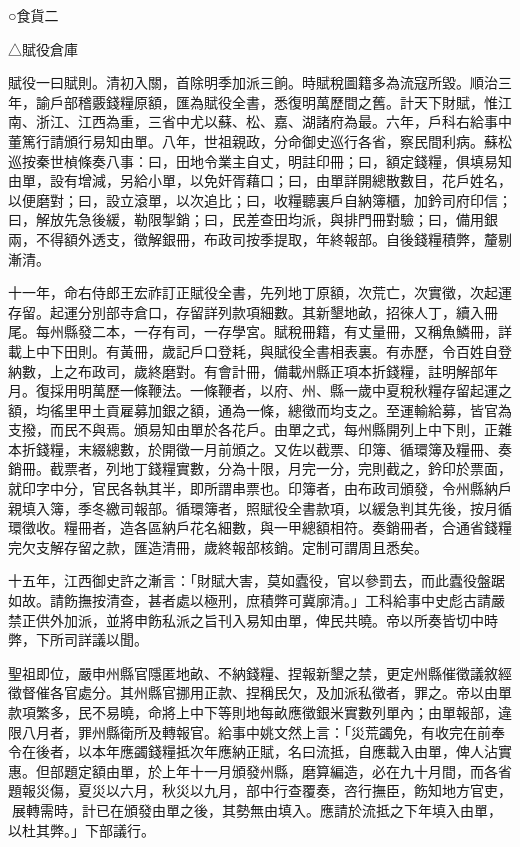 
\begin{pinyinscope}
○食貨二

△賦役倉庫

賦役一曰賦則。清初入關，首除明季加派三餉。時賦稅圖籍多為流寇所毀。順治三年，諭戶部稽覈錢糧原額，匯為賦役全書，悉復明萬歷間之舊。計天下財賦，惟江南、浙江、江西為重，三省中尤以蘇、松、嘉、湖諸府為最。六年，戶科右給事中董篤行請頒行易知由單。八年，世祖親政，分命御史巡行各省，察民間利病。蘇松巡按秦世楨條奏八事：曰，田地令業主自丈，明註印冊；曰，額定錢糧，俱填易知由單，設有增減，另給小單，以免奸胥藉口；曰，由單詳開總散數目，花戶姓名，以便磨對；曰，設立滾單，以次追比；曰，收糧聽裏戶自納簿櫃，加鈐司府印信；曰，解放先急後緩，勒限掣銷；曰，民差查田均派，與排門冊對驗；曰，備用銀兩，不得額外透支，徵解銀冊，布政司按季提取，年終報部。自後錢糧積弊，釐剔漸清。

十一年，命右侍郎王宏祚訂正賦役全書，先列地丁原額，次荒亡，次實徵，次起運存留。起運分別部寺倉口，存留詳列款項細數。其新墾地畝，招徠人丁，續入冊尾。每州縣發二本，一存有司，一存學宮。賦稅冊籍，有丈量冊，又稱魚鱗冊，詳載上中下田則。有黃冊，歲記戶口登耗，與賦役全書相表裏。有赤歷，令百姓自登納數，上之布政司，歲終磨對。有會計冊，備載州縣正項本折錢糧，註明解部年月。復採用明萬歷一條鞭法。一條鞭者，以府、州、縣一歲中夏稅秋糧存留起運之額，均徭里甲土貢雇募加銀之額，通為一條，總徵而均支之。至運輸給募，皆官為支撥，而民不與焉。頒易知由單於各花戶。由單之式，每州縣開列上中下則，正雜本折錢糧，末綴總數，於開徵一月前頒之。又佐以截票、印簿、循環簿及糧冊、奏銷冊。截票者，列地丁錢糧實數，分為十限，月完一分，完則截之，鈐印於票面，就印字中分，官民各執其半，即所謂串票也。印簿者，由布政司頒發，令州縣納戶親填入簿，季冬繳司報部。循環簿者，照賦役全書款項，以緩急判其先後，按月循環徵收。糧冊者，造各區納戶花名細數，與一甲總額相符。奏銷冊者，合通省錢糧完欠支解存留之款，匯造清冊，歲終報部核銷。定制可謂周且悉矣。

十五年，江西御史許之漸言：「財賦大害，莫如蠹役，官以參罰去，而此蠹役盤踞如故。請飭撫按清查，甚者處以極刑，庶積弊可冀廓清。」工科給事中史彪古請嚴禁正供外加派，並將申飭私派之旨刊入易知由單，俾民共曉。帝以所奏皆切中時弊，下所司詳議以聞。

聖祖即位，嚴申州縣官隱匿地畝、不納錢糧、捏報新墾之禁，更定州縣催徵議敘經徵督催各官處分。其州縣官挪用正款、捏稱民欠，及加派私徵者，罪之。帝以由單款項繁多，民不易曉，命將上中下等則地每畝應徵銀米實數列單內；由單報部，違限八月者，罪州縣衛所及轉報官。給事中姚文然上言：「災荒蠲免，有收完在前奉令在後者，以本年應蠲錢糧抵次年應納正賦，名曰流抵，自應載入由單，俾人沾實惠。但部題定額由單，於上年十一月頒發州縣，磨算編造，必在九十月間，而各省題報災傷，夏災以六月，秋災以九月，部中行查覆奏，咨行撫臣，飭知地方官吏，展轉需時，計已在頒發由單之後，其勢無由填入。應請於流抵之下年填入由單，以杜其弊。」下部議行。


\end{pinyinscope}
